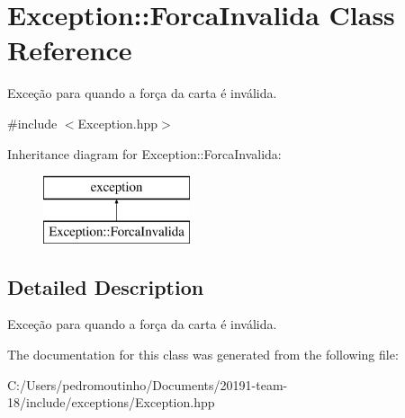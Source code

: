 \hypertarget{class_exception_1_1_forca_invalida}{}\section{Exception\+::Forca\+Invalida Class Reference}
\label{class_exception_1_1_forca_invalida}


Exceção para quando a força da carta é inválida.  




{\ttfamily \#include $<$Exception.\+hpp$>$}

Inheritance diagram for Exception\+::Forca\+Invalida\+:\begin{figure}[H]
\begin{center}
\leavevmode
\includegraphics[height=2.000000cm]{class_exception_1_1_forca_invalida}
\end{center}
\end{figure}


\subsection{Detailed Description}
Exceção para quando a força da carta é inválida. 



The documentation for this class was generated from the following file\+:\begin{DoxyCompactItemize}
\item 
C\+:/\+Users/pedromoutinho/\+Documents/20191-\/team-\/18/include/exceptions/Exception.\+hpp\end{DoxyCompactItemize}
